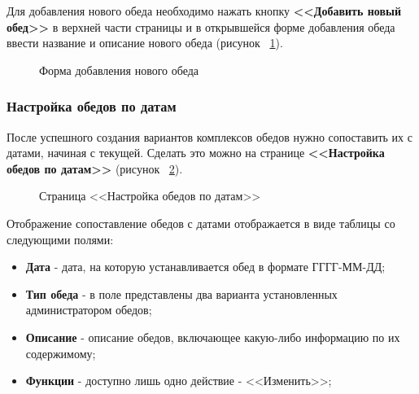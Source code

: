 \documentclass[a4paper]{article}
\begin{document}
Для добавления нового обеда необходимо нажать кнопку \textbf{<<Добавить новый обед>>} в верхней части страницы и в открывшейся форме добавления обеда ввести название и описание нового обеда (рисунок ~\ref{fig:image11}).

\begin{figure}[h]
\caption{Форма добавления нового обеда}
\label{fig:image11}
\end{figure}

\subsubsection{Настройка обедов по датам}

После успешного создания вариантов комплексов обедов нужно сопоставить их с датами, начиная с текущей. Сделать это можно на странице \textbf{<<Настройка обедов по датам>>} (рисунок ~\ref{fig:image12}).

\begin{figure}[h]
\caption{Страница <<Настройка обедов по датам>>}
\label{fig:image12}
\end{figure}

Отображение сопоставление обедов с датами отображается в виде таблицы со следующими полями:

\begin{itemize}
\setlength{\itemsep}{-2mm}
	\item \textbf{Дата} - дата, на которую устанавливается обед в формате ГГГГ-ММ-ДД;
	\item \textbf{Тип обеда} - в поле представлены два варианта установленных администратором обедов;
	\item \textbf{Описание} - описание обедов, включающее какую-либо информацию по их содержимому;
	\item \textbf{Функции} - доступно лишь одно действие - <<Изменить>>; 
\end{itemize}
\end{document}
